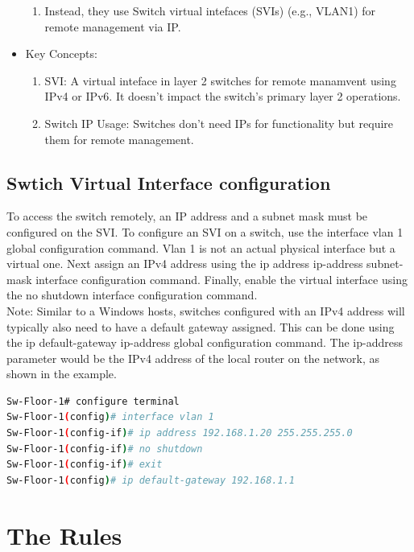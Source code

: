 \documentclass[a4paper,11pt]{article}
\begin{document}
\begin{itemize}
\begin{enumerate}
        \item Instead, they use Switch virtual intefaces (SVIs) (e.g., VLAN1) for remote management via IP.\\
    \end{enumerate}
    \item Key Concepts:
    \begin{enumerate}
        \item SVI: A virtual inteface in layer 2 switches for remote manamvent using IPv4 or IPv6. It doesn't impact the switch's primary layer 2 operations.\\
        \item Switch IP Usage: Switches don't need IPs for functionality but require them for remote management.\\
    \end{enumerate}
\end{itemize}

\subsection{Swtich Virtual Interface configuration}
To access the switch remotely, an IP address and a subnet mask must be configured on the SVI. To configure an SVI on a switch, use the interface vlan 1 global configuration command. Vlan 1 is not an actual physical interface but a virtual one. Next assign an IPv4 address using the ip address ip-address subnet-mask interface configuration command. Finally, enable the virtual interface using the no shutdown interface configuration command.\\
Note: Similar to a Windows hosts, switches configured with an IPv4 address will typically also need to have a default gateway assigned. This can be done using the ip default-gateway ip-address global configuration command. The ip-address parameter would be the IPv4 address of the local router on the network, as shown in the example.\\

\begin{lstlisting}[language=bash, caption=Switch Configuration]
Sw-Floor-1# configure terminal
Sw-Floor-1(config)# interface vlan 1
Sw-Floor-1(config-if)# ip address 192.168.1.20 255.255.255.0
Sw-Floor-1(config-if)# no shutdown
Sw-Floor-1(config-if)# exit
Sw-Floor-1(config)# ip default-gateway 192.168.1.1
\end{lstlisting}

\newpage
\section{The Rules}
\end{document}
